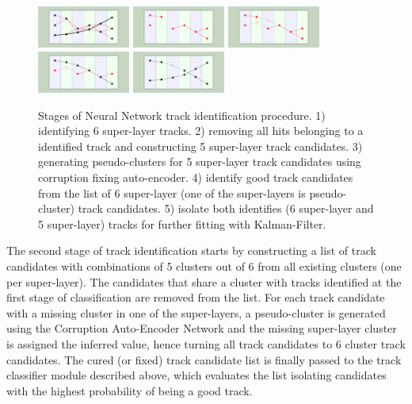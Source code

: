  \begin{figure}[!h]
\begin{center}
 \includegraphics[angle=90,width=1.2in]{images/iden_6_sl.pdf}
  \includegraphics[angle=90,width=1.2in]{images/iden_5_sl_a.pdf}
    \includegraphics[angle=90,width=1.2in]{images/iden_5_sl_b.pdf}
      \includegraphics[angle=90,width=1.2in]{images/iden_5_sl_c.pdf}
            \includegraphics[angle=90,width=1.2in]{images/iden_5_sl_d.pdf}

\caption {Stages of Neural Network track identification procedure. 1) identifying 6 super-layer tracks. 2) removing all hits 
belonging to a identified track and constructing 5 super-layer track candidates. 3) generating pseudo-clusters for 5 super-layer
track candidates using corruption fixing auto-encoder. 4) identify good track candidates from the list of 6 super-layer 
(one of the super-layers is pseudo-cluster) track candidates. 5) isolate both identifies (6 super-layer and 5 super-layer) tracks 
for further fitting with Kalman-Filter.}
 \label{network:procedure}
 \end{center}
\end{figure}

The second stage of track identification starts by constructing a list of track candidates with combinations of 5 clusters 
out of 6 from all existing clusters (one per super-layer). The candidates that share a cluster with tracks
identified at the first stage of classification are removed from the list. For each track candidate with a missing cluster
in one of the super-layers, a pseudo-cluster is generated using the Corruption Auto-Encoder Network and the missing super-layer 
cluster is assigned the inferred value, hence turning all track candidates to 6 cluster track candidates. The 
cured (or fixed) track candidate list is finally passed to the track classifier module described above, which evaluates the list 
isolating candidates with the highest probability of being a good track. 

